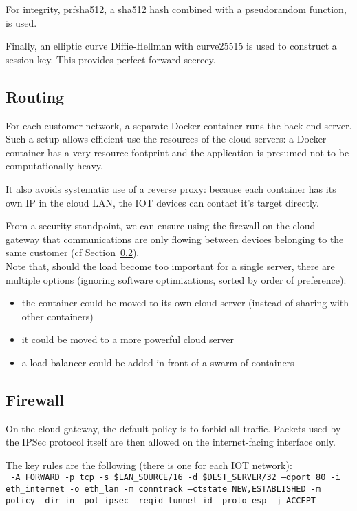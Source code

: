 \documentclass[paper=a4, fontsize=11pt]{scrartcl}
\begin{document}
For integrity, prfsha512, a sha512 hash combined with a pseudorandom
function, is used.

Finally, an elliptic curve Diffie-Hellman with curve25515 is used to
construct a session key.
This provides perfect forward secrecy.

\subsection{Routing}

For each customer network, a separate Docker container runs the back-end server.
Such a setup allows efficient use the resources of the cloud servers: a Docker
container has a very resource footprint and the application is presumed not to
be computationally heavy.

It also avoids systematic use of a reverse proxy: because each container has its
own IP in the cloud LAN, the IOT devices can contact it's target directly.

From a security standpoint, we can ensure using the firewall on the cloud
gateway that communications are only flowing between devices belonging to
the same customer (cf Section~\ref{firewall}).
\\

Note that, should the load become too important for a single server, there are
multiple options (ignoring software optimizations, sorted by order of
preference):
\begin{itemize}
    \item the container could be moved to its own cloud server (instead of
    sharing with other containers)
    \item it could be moved to a more powerful cloud server
    \item a load-balancer could be added in front of a swarm of containers
\end{itemize}

\subsection{Firewall}\label{firewall}

On the cloud gateway, the default policy is to forbid all traffic.
Packets used by the IPSec protocol itself are then allowed on the
internet-facing interface only.

The key rules are the following (there is one for each IOT network):
\\

\texttt{%
    -A FORWARD -p tcp -s \$LAN\_SOURCE/16 -d \$DEST\_SERVER/32 --dport 80 -i
    eth\_internet -o eth\_lan -m conntrack --ctstate NEW,ESTABLISHED -m policy
    --dir in --pol ipsec --reqid tunnel\_id --proto esp -j ACCEPT
}
\\
\end{document}

